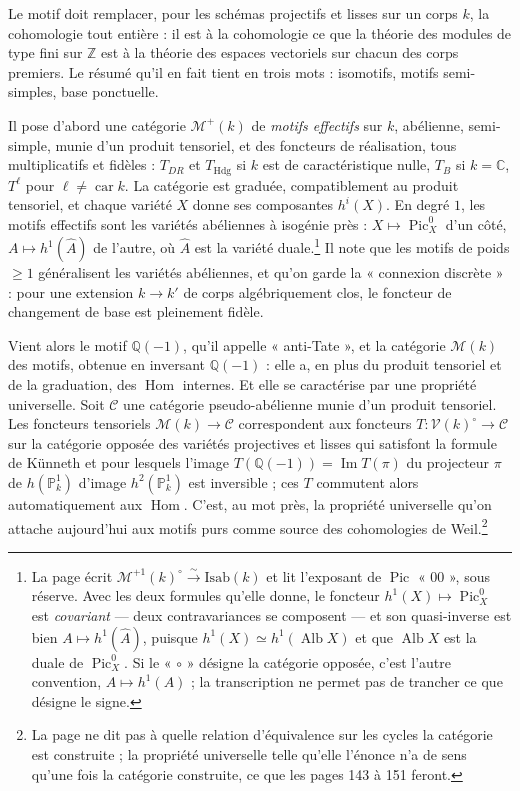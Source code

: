 \documentclass[11pt,a4paper]{article}
\begin{document}
Le motif doit remplacer, pour les schémas projectifs et lisses sur un corps
$k$, la cohomologie tout entière : il est à la cohomologie ce que la théorie
des modules de type fini sur $\mathbb{Z}$ est à la théorie des espaces
vectoriels sur chacun des corps premiers. Le résumé qu'il en fait tient en
trois mots : isomotifs, motifs semi-simples, base ponctuelle.

Il pose d'abord une catégorie $\mathcal{M}^{+}(k)$ de \emph{motifs effectifs}
sur $k$, abélienne, semi-simple, munie d'un produit tensoriel, et des
foncteurs de réalisation, tous multiplicatifs et fidèles : $T_{DR}$ et
$T_{\mathrm{Hdg}}$ si $k$ est de caractéristique nulle, $T_{B}$ si
$k = \mathbb{C}$, $T^{\ell}$ pour $\ell \neq \operatorname{car} k$. La
catégorie est graduée, compatiblement au produit tensoriel, et chaque variété
$X$ donne ses composantes $h^{i}(X)$. En degré $1$, les motifs effectifs sont
les variétés abéliennes à isogénie près : $X \mapsto
\operatorname{Pic}^{0}_{X}$ d'un côté, $A \mapsto h^{1}(\hat{A})$ de l'autre,
où $\hat{A}$ est la variété duale.\footnote{La page écrit
$\mathcal{M}^{+1}(k)^{\circ} \xrightarrow{\sim} \mathrm{Isab}(k)$ et lit
l'exposant de $\operatorname{Pic}$ « $00$ », sous réserve. Avec les deux
formules qu'elle donne, le foncteur $h^{1}(X) \mapsto \operatorname{Pic}^{0}_{X}$
est \emph{covariant} --- deux contravariances se composent --- et son
quasi-inverse est bien $A \mapsto h^{1}(\hat{A})$, puisque $h^{1}(X) \simeq
h^{1}(\operatorname{Alb} X)$ et que $\operatorname{Alb} X$ est la duale de
$\operatorname{Pic}^{0}_{X}$. Si le « $\circ$ » désigne la catégorie opposée,
c'est l'autre convention, $A \mapsto h^{1}(A)$ ; la transcription ne permet pas
de trancher ce que désigne le signe.} Il note que les motifs de poids
$\geqslant 1$ généralisent les variétés abéliennes, et qu'on garde la
« connexion discrète » : pour une extension $k \to k'$ de corps
algébriquement clos, le foncteur de changement de base est pleinement fidèle.

Vient alors le motif $\mathbb{Q}(-1)$, qu'il appelle « anti-Tate », et la
catégorie $\mathcal{M}(k)$ des motifs, obtenue en inversant $\mathbb{Q}(-1)$ :
elle a, en plus du produit tensoriel et de la graduation, des $\operatorname{Hom}$
internes. Et elle se caractérise par une propriété universelle. Soit
$\mathcal{C}$ une catégorie pseudo-abélienne munie d'un produit tensoriel. Les
foncteurs tensoriels $\mathcal{M}(k) \to \mathcal{C}$ correspondent aux
foncteurs $T \colon \mathcal{V}(k)^{\circ} \to \mathcal{C}$ sur la catégorie
opposée des variétés projectives et lisses qui satisfont la formule de Künneth
et pour lesquels l'image $T(\mathbb{Q}(-1)) = \operatorname{Im} T(\pi)$ du
projecteur $\pi$ de $h(\mathbb{P}^{1}_{k})$ d'image $h^{2}(\mathbb{P}^{1}_{k})$
est inversible ; ces $T$ commutent alors automatiquement aux $\operatorname{Hom}$.
C'est, au mot près, la propriété universelle qu'on attache aujourd'hui aux
motifs purs comme source des cohomologies de Weil.\footnote{La page ne dit pas
à quelle relation d'équivalence sur les cycles la catégorie est construite ; la
propriété universelle telle qu'elle l'énonce n'a de sens qu'une fois la
catégorie construite, ce que les pages 143 à 151 feront.}
\end{document}
